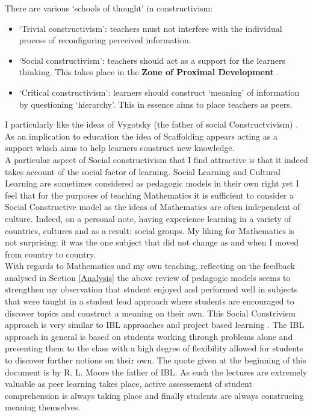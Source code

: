 \documentclass[a4paper,12pt]{article}
\begin{document}
There are various `schools of thought' in constructivism:

\begin{itemize}
    \item `Trivial constructivism': teachers must not interfere with the individual process of reconfiguring perceived information.
    \item  `Social constructivism': teachers should act as a support for the learners thinking. This takes place in the \textbf{Zone of Proximal Development} \cite{Vygotsky1978a}.
    \item  `Critical constructivism': learners should construct `meaning' of information by questioning `hierarchy'. This in essence aims to place teachers as peers.
\end{itemize}

I particularly like the ideas of Vygotsky \cite{Vygotsky1978a} (the father of social Constructvivism) . As an implication to education the idea of Scaffolding appears acting as a support which aims to help learners construct new knowledge.\\

A particular aspect of Social constructivism that I find attractive is that it indeed takes account of the social factor of learning. Social Learning and Cultural Learning are sometimes considered as pedagogic models in their own right yet I feel that for the purposes of teaching Mathematics it is sufficient to consider a Social Constructive model as the ideas of Mathematics are often independent of culture. Indeed, on a personal note, having experience learning in a variety of countries, cultures and as a result: social groups. My liking for Mathematics is not surprising: it was the one subject that did not change as and when I moved from country to country.\\


With regards to Mathematics and my own teaching, reflecting on the feedback analysed in Section \ref{Analysis} the above review of pedagogic models seems to strengthen my observation that student enjoyed and performed well in subjects that were taught in a student lead approach where students are encouraged to discover topics and construct a meaning on their own. This Social Constrivism approach is very similar to IBL approaches \cite{Mahavier2006} and project based learning \cite{Barell2007a,Schwartz2001b}. The IBL approach in general is based on students working through problems alone and presenting them to the class with a high degree of flexibility allowed for students to discover further notions on their own. The quote given at the beginning of this document is by R. L. Moore the father of IBL. As such the lectures are extremely valuable as peer learning takes place, active assessement of student comprehension is always taking place and finally students are always construcing meaning themselves.\\
\end{document}
